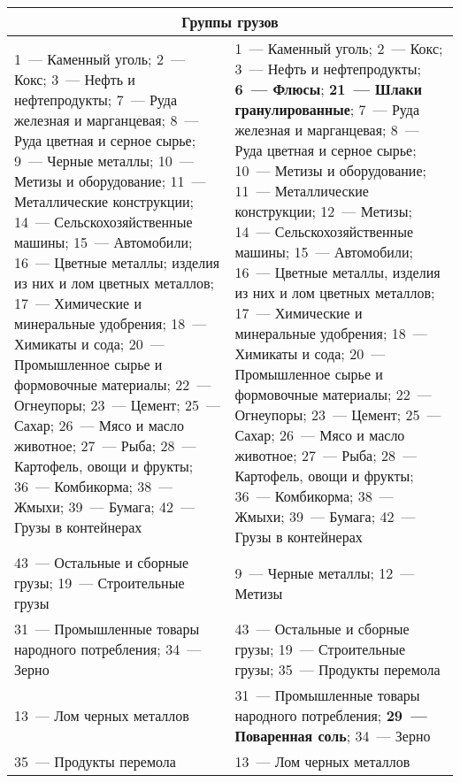 \begin{table}\small
\begin{center}
\begin{tabular}{|p{7.8cm}||p{7.8cm}|}
\multicolumn{2}{c}{Группы грузов}\\[6pt]
\hline
 1~--- Каменный уголь; 2~--- Кокс;  3~--- Нефть и нефтепродукты; 7~---
 Руда железная и марганцевая; 8~--- Руда цветная и серное сырье;
 9~--- Черные металлы; 10~--- Метизы и оборудование; 11~---
 Металлические конструкции;  14~--- Сельскохозяйственные машины;
 15~--- Автомобили; 16~--- Цветные металлы; изделия из них и лом цветных металлов;
 17~--- Химические и минеральные удобрения; 18~--- Химикаты и сода;
 20~--- Промышленное сырье и формовочные материалы; 22~--- Огнеупоры;
 23~--- Цемент; 25~--- Сахар; 26~--- Мясо и масло животное; 27~--- Рыба;
 28~--- Картофель, овощи и фрукты; 36~--- Комбикорма;  38~--- Жмыхи;
 39~--- Бумага; 42~--- Грузы в контейнерах
 &
 1~--- Каменный уголь; 2~--- Кокс;  3~--- Нефть и нефтепродукты;
 \textbf{6~--- Флюсы}; \textbf{21~--- Шлаки гранулированные}; 7~---
 Руда железная и марганцевая; 8~--- Руда цветная и серное сырье;
 10~--- Метизы и оборудование; 11~--- Металлические конструкции;
 12~--- Метизы; 14~--- Сельскохозяйственные машины; 15~--- Автомобили;
 16~--- Цветные металлы, изделия из них и лом цветных металлов; 17~---
 Химические и минеральные удобрения; 18~--- Химикаты и сода;  20~---
 Промышленное сырье и формовочные материалы; 22~--- Огнеупоры; 23~---
 Цемент; 25~--- Сахар; 26~--- Мясо и масло животное; 27~--- Рыба; 28~---
 Картофель, овощи и фрукты; 36~--- Комбикорма;  38~--- Жмыхи;   39~---
 Бумага; 42~--- Грузы в контейнерах\\
\hline
43~--- Остальные и сборные грузы; 19~--- Строительные грузы
&
9~--- Черные металлы; 12~--- Метизы\\
\hline
31~--- Промышленные товары народного потребления; 34~--- Зерно
&43~--- Остальные и сборные грузы; 19~--- Строительные грузы;
35~--- Продукты перемола \\
\hline
13~--- Лом черных металлов
&
31~--- Промышленные товары народного потребления;
\textbf{29~--- Поваренная соль}; 34~--- Зерно\\
\hline
35~--- Продукты перемола
& 13~--- Лом черных металлов\\
\hline
\end{tabular}
\end{center}
\end{table}

